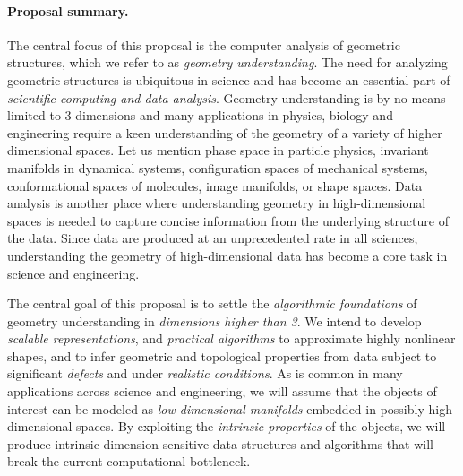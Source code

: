 


\paragraph{Proposal summary.} 
The central focus of this proposal is the computer analysis of
geometric structures, which we refer to as {\em geometry
  understanding}.  The need for analyzing geometric structures is
ubiquitous in science and has become an essential part of {\em scientific
computing and data analysis}. Geometry understanding is by no means
limited to 3-dimensions and many applications in physics, biology and
engineering require a keen understanding of the geometry of a variety
of higher dimensional spaces. Let us mention phase space in particle
physics, invariant manifolds in dynamical systems, configuration
spaces of mechanical systems, conformational spaces of molecules,
image manifolds, or shape spaces.
Data analysis  is another place where understanding
geometry in high-dimensional spaces is needed to
capture concise information from the underlying structure of the data.  
Since data are produced at an unprecedented rate in all
sciences, understanding the geometry of high-dimensional data %
has become a core task in science and engineering.

The central goal of this proposal is to settle the {\em algorithmic
foundations} of geometry understanding in {\em dimensions higher than
3}.  We intend to develop {\em scalable representations}, and {\em
practical algorithms} to approximate highly nonlinear shapes, and to
infer geometric and topological properties from data subject to
significant {\em defects} and under {\em realistic conditions}.
As is common in many applications across science and engineering, we
will assume that the objects of interest can be modeled as {\em
  low-dimensional manifolds} embedded in possibly high-dimensional
spaces. By exploiting the {\em intrinsic properties} of the objects,
we will produce intrinsic dimension-sensitive data structures and algorithms
that will break the current computational
bottleneck.

